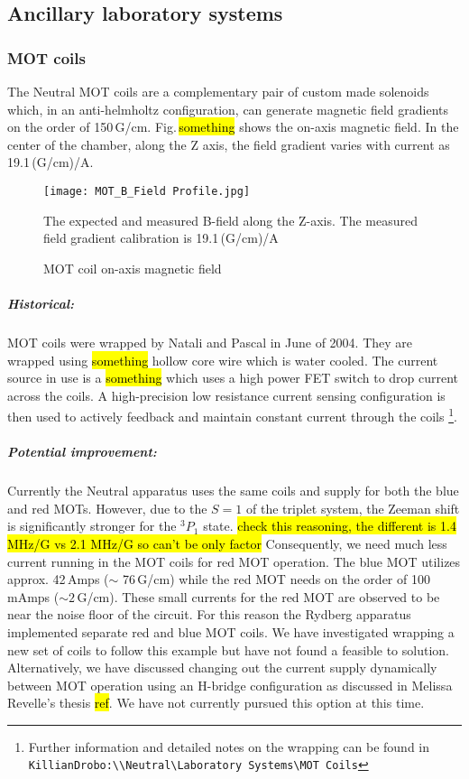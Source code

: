\subsection{Ancillary laboratory systems} \label{ssec:misc_sys}
\subsubsection{MOT coils}
The Neutral MOT coils are a complementary pair of custom made solenoids which, in an anti-helmholtz configuration, can generate magnetic field gradients on the order of 150\,G/cm.
Fig.\,\hl{something} shows the on-axis magnetic field.
In the center of the chamber, along the Z axis, the field gradient varies with current as 19.1\,(G/cm)/A.
\begin{figure}
		\centerline{
		\texttt{[image: MOT\_B\_Field Profile.jpg]}}
		\caption{MOT coil on-axis magnetic field}{The expected and measured B-field along the Z-axis. The measured field gradient calibration is 19.1\,(G/cm)/A}
		\label{fig:pbTimingJitter}
	\end{figure} 

\subparagraph{Historical:} 
\setcounter{footnote}{0}
MOT coils were wrapped by Natali and Pascal in June of 2004.
They are wrapped using \hl{something} hollow core wire which is water cooled.
The current source in use is a \hl{something} which uses a high power FET switch to drop current across the coils.
A high-precision low resistance current sensing configuration is then used to actively feedback and maintain constant current through the coils \footnote{Further information and detailed notes on the wrapping can be found in \texttt{KillianDrobo:\textbackslash\textbackslash Neutral\textbackslash Laboratory Systems\textbackslash MOT Coils}}.

\subparagraph{Potential improvement:}
Currently the Neutral apparatus uses the same coils and supply for both the blue and red MOTs.
However, due to the $S=1$ of the triplet system, the Zeeman shift is significantly stronger for the $^3P_1$ state. \hl{check this reasoning, the different is 1.4 MHz/G vs 2.1 MHz/G so can't be only factor}
Consequently, we need much less current running in the MOT coils for red MOT operation.
The blue MOT utilizes approx. 42\,Amps ($\sim$ 76\,G/cm) while the red MOT needs on the order of 100\,mAmps ($\sim 2$\,G/cm).
These small currents for the red MOT are observed to be near the noise floor of the circuit.
For this reason the Rydberg apparatus implemented separate red and blue MOT coils.
We have investigated wrapping a new set of coils to follow this example but have not found a feasible to solution.
Alternatively, we have discussed changing out the current supply dynamically between MOT operation using an H-bridge configuration as discussed in Melissa Revelle's thesis \hl{ref}.
We have not currently pursued this option at this time.

